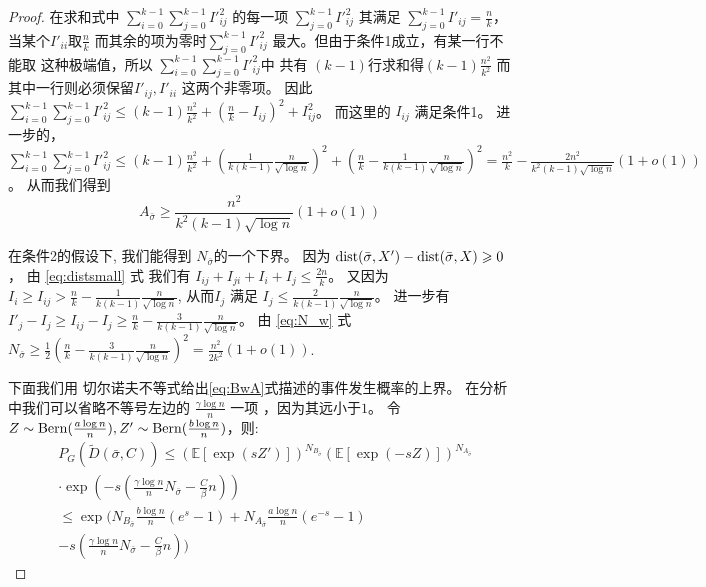 \begin{proof}
    在求和式中 $\sum_{i=0}^{k-1} \sum_{j=0}^{k-1} I'^2_{ij}$
    的每一项 $\sum_{j=0}^{k-1} I'^2_{ij}$ 其满足 $\sum_{j=0}^{k-1}
    I'_{ij} = \frac{n}{k}$，当某个$I'_{ii}$取$\frac{n}{k}$
    而其余的项为零时$\sum_{j=0}^{k-1} I'^2_{ij}$
    最大。但由于条件1成立，有某一行不能取
    这种极端值，所以 $\sum_{i=0}^{k-1} \sum_{j=0}^{k-1} I'^2_{ij}$中
    共有 $(k-1)$行求和得$ (k-1)\frac{n^2}{k^2}$
    而其中一行则必须保留$I'_{ij}, I'_{ii}$ 这两个非零项。
    因此 $\sum_{i=0}^{k-1} \sum_{j=0}^{k-1} I'^2_{ij}
    \leq (k-1)\frac{n^2}{k^2} + (\frac{n}{k} - I_{ij})^2 + I^2_{ij}$。
    而这里的
    $I_{ij}$ 满足条件1。
    进一步的， $\sum_{i=0}^{k-1} \sum_{j=0}^{k-1} I'^2_{ij} \leq (k-1)\frac{n^2}{k^2} + (\frac{1}{k(k-1)}\frac{n}{\sqrt{\log n}})^2
    + (\frac{n}{k} - \frac{1}{k(k-1)}\frac{n}{\sqrt{\log n}})^2 = \frac{n^2}{k} - \frac{2n^2}{k^2 (k-1)\sqrt{\log n}}(1+o(1))$。
    从而我们得到
  \begin{equation}\label{eq:Asigma}
    A_{\bar{\sigma}} \geq \frac{n^2}{k^2 (k-1)\sqrt{\log n}}(1+o(1))
    \end{equation}
    
    
    在条件2的假设下, 我们能得到
    $N_{\bar{\sigma}}$的一个下界。
    因为
    $\operatorname{dist}(\bar{\sigma}, X') - \operatorname{dist}(\bar{\sigma}, X) \geqslant 0$，
     由 \eqref{eq:distsmall} 式 我们有
    $I_{ij} + I_{ji} + I_{i} + I_j \leq \frac{2n}{k} $。
    又因为 $I_i \geq I_{ij} > \frac{n}{k} - \frac{1}{k(k-1)}\frac{n}{\sqrt{\log n}}$,
    从而$I_j $ 满足
    $I_j \leq \frac{2}{k(k-1)}\frac{n}{\sqrt{\log n} }$。
    进一步有 $I'_j - I_j \geq I_{ij} - I_j \geq  \frac{n}{k} - \frac{3}{k(k-1)}\frac{n}{\sqrt{\log n} }$。
    由 \eqref{eq:N_w}
    式 $N_{\bar{\sigma}} \geq \frac{1}{2}(\frac{n}{k} - \frac{3}{k(k-1)}\frac{n}{\sqrt{\log n}})^2 = \frac{n^2}{2k^2}(1+o(1))$.
    
    下面我们用
     切尔诺夫不等式给出\eqref{eq:BwA}式描述的事件发生概率的上界。
     在分析中我们可以省略不等号左边的 $\frac{\gamma \log n}{n}$ 一项
     ，因为其远小于$1$。
    令 $Z \sim \operatorname{Bern}(\frac{a \log n}{n}), Z' \sim \operatorname{Bern}(\frac{b \log n}{n})$，则:
    \begin{align*}
    &P_G(\widetilde{D}(\bar{\sigma}, C))
    \leq (\mathbb{E}[\exp(sZ')])^{N_{B_{\bar{\sigma}}}}
    (\mathbb{E}[\exp(-sZ)])^{N_{A_{\bar{\sigma}}}}\\
    &\cdot \exp(-s(\frac{\gamma \log n}{n} N_{\bar{\sigma}}  - \frac{C}{\beta}n)) \\
    & \leq \exp\Big(N_{B_{\bar{\sigma}}}
    \frac{b\log n}{n}(e^s -1) + N_{A_{\bar{\sigma}}}\frac{a\log n}{n} (e^{-s} - 1) \\
    &-s(\frac{\gamma \log n}{n} N_{\bar{\sigma}}  - \frac{C}{\beta}n)\Big) 
    \end{align*}
    

\end{proof}
